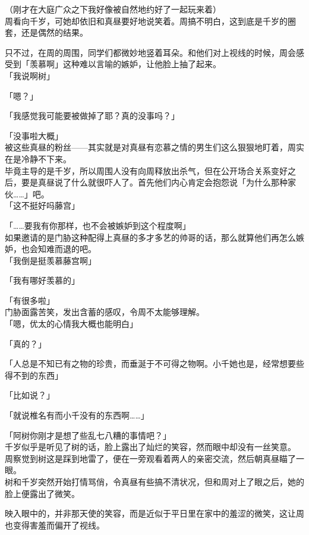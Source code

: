 （刚才在大庭广众之下我好像被自然地约好了一起玩来着）\\

周看向千岁，可她却依旧和真昼要好地说笑着。周搞不明白，这到底是千岁的圈套，还是偶然的结果。

只不过，在周的周围，同学们都微妙地竖着耳朵。和他们对上视线的时候，周会感受到「羡慕啊」这种难以言喻的嫉妒，让他脸上抽了起来。\\

「我说啊树」

「嗯？」

「我感觉我可能要被做掉了耶？真的没事吗？」

「没事啦大概」\\

被这些真昼的粉丝——其实就是对真昼有恋慕之情的男生们这么狠狠地盯着，周实在是冷静不下来。\\

毕竟主导的是千岁，所以周围人没有向周释放出杀气，但在公开场合关系变好之后，要是真昼说了什么就很吓人了。首先他们内心肯定会抱怨说「为什么那种家伙……」吧。\\

「这不挺好吗藤宫」

「……要我有你那样，也不会被嫉妒到这个程度啊」\\

如果邀请的是门胁这种配得上真昼的多才多艺的帅哥的话，那么就算他们再怎么嫉妒，也会知难而退的吧。\\

「我倒是挺羡慕藤宫啊」

「我有哪好羡慕的」

「有很多啦」\\

门胁面露苦笑，发出含蓄的感叹，令周不太能够理解。\\

「嗯，优太的心情我大概也能明白」

「真的？」

「人总是不知已有之物的珍贵，而垂涎于不可得之物啊。小千她也是，经常想要些得不到的东西」

「比如说？」

「就说椎名有而小千没有的东西啊……」

「阿树你刚才是想了些乱七八糟的事情吧？」\\

千岁似乎是听见了树的话，脸上露出了灿烂的笑容，然而眼中却没有一丝笑意。\\

周察觉到树这是踩到地雷了，便在一旁观看着两人的亲密交流，然后朝真昼瞄了一眼。\\

树和千岁突然开始打情骂俏，令真昼有些搞不清状况，但和周对上了眼之后，她的脸上便露出了微笑。

映入眼中的，并非那天使的笑容，而是近似于平日里在家中的羞涩的微笑，这让周也变得害羞而偏开了视线。
